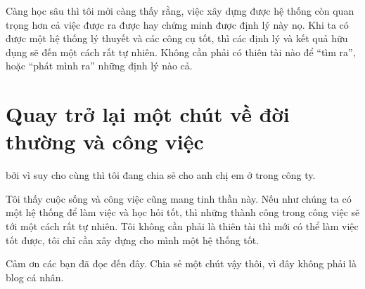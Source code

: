 \documentclass[a4paper,12pt]{article}
\begin{document}
Càng học sâu thì tôi mới càng thấy rằng, việc xây dựng được hệ thống còn quan trọng hơn
cả việc được ra được hay chứng minh được định lý này nọ. Khi ta có được một hệ thống
lý thuyết và các công cụ tốt, thì các định lý và kết quả hữu dụng sẽ đến một cách rất tự
nhiên. Không cần phải có thiên tài nào để ``tìm ra'', hoặc ``phát mình ra'' những định lý
nào cả.

\section*{Quay trở lại một chút về đời thường và công việc}

bởi vì suy cho cùng thì tôi đang chia sẻ cho anh chị em ở trong công ty.

Tôi thấy cuộc sống và công việc cũng mang tinh thần này. Nếu như chúng ta có một hệ thống
để làm việc và học hỏi tốt, thì những thành công trong công việc sẽ tới một cách rất tự nhiên.
Tôi không cần phải là thiên tài thì mới có thể làm việc tốt được, tôi chỉ cần xây dựng cho
mình một hệ thống tốt.

Cảm ơn các bạn đã đọc đến đây. Chia sẻ một chút vậy thôi, vì đây không phải là blog cá nhân.
\end{document}
